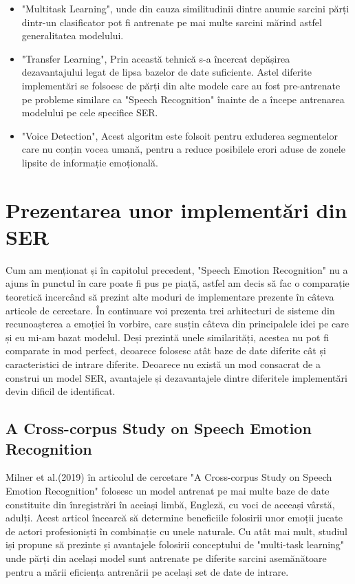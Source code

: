 \documentclass[a4paper,12pt]{book}
\begin{document}
						\begin{itemize}
							\setlength\topsep{0pt}
							\setlength\itemsep{0pt}
							\setlength{\itemindent}{1cm}
							\item "Multitask Learning", unde din cauza similitudinii dintre anumie sarcini părți dintr-un clasificator pot fi antrenate pe mai multe sarcini mărind astfel generalitatea modelului.
							\item "Transfer Learning", Prin această tehnică s-a încercat depășirea dezavantajului legat de lipsa bazelor de date suficiente. Astel diferite implementări se folsoesc de părți din alte modele care au fost pre-antrenate pe probleme similare ca "Speech Recognition" înainte de a începe antrenarea modelului pe cele specifice SER.
							\item "Voice Detection", Acest algoritm este folsoit pentru exluderea segmentelor care nu conțin vocea umană, pentru a reduce posibilele erori aduse de zonele lipsite de informație emoțională. 					
					\end{itemize}
				
				
				\section{Prezentarea unor implementări din SER} \label{papers}
					Cum am menționat și în capitolul precedent, "Speech Emotion Recognition" nu a ajuns în punctul în care poate fi pus pe piață, astfel am decis să fac o comparație teoretică incercând să prezint alte moduri de implementare prezente în câteva articole de cercetare. În continuare voi prezenta trei arhitecturi de sisteme din recunoașterea a emoției în vorbire, care susțin câteva din principalele idei pe care și eu mi-am bazat modelul. Deși prezintă unele similarități, acestea nu pot fi comparate in mod perfect, deoarece folosesc atât baze de date diferite cât și caracteristici de intrare diferite. Deoarece nu există un mod consacrat de a construi un model SER, avantajele și dezavantajele dintre diferitele implementări devin dificil de identificat. \par		
					
					\subsection{A Cross-corpus Study on Speech Emotion Recognition} \label{prez_multi_domain}
					
					
					Milner et al.(2019) în articolul de cercetare "A Cross-corpus Study on Speech Emotion Recognition" \cite{multi-domain} folosesc un model antrenat pe mai multe baze de date constituite din înregistrări în aceiași limbă, Engleză, cu voci de aceeași vârstă, adulți. Acest articol încearcă să determine beneficiile folosirii  unor emoții jucate de actori profesioniști în combinație cu unele naturale. Cu atât mai mult, studiul iși propune să prezinte și avantajele folosirii conceptului de "multi-task learning" unde părți din același model sunt antrenate pe diferite sarcini asemănătoare pentru a mării eficiența antrenării pe același set de date de intrare. \par
					
\end{document}

